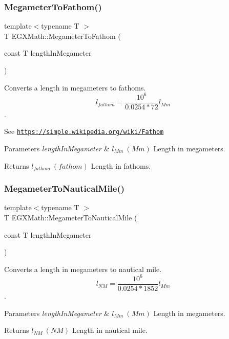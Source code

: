 \subsubsection{\texorpdfstring{Megameter\+To\+Fathom()}{MegameterToFathom()}}
{\footnotesize\ttfamily template$<$typename T $>$ \\
T E\+G\+X\+Math\+::\+Megameter\+To\+Fathom (\begin{DoxyParamCaption}\item[{const T}]{length\+In\+Megameter }\end{DoxyParamCaption})}



Converts a length in megameters to fathoms. \[ l_{fathom}= \frac{10^{6}}{0.0254 * 72} l_{Mm} \]. 

See \href{https://simple.wikipedia.org/wiki/Fathom}{\tt https\+://simple.\+wikipedia.\+org/wiki/\+Fathom} 
\begin{DoxyParams}{Parameters}
{\em length\+In\+Megameter} & $ l_{Mm}\ (Mm)$ Length in megameters. \\
\hline
\end{DoxyParams}
\begin{DoxyReturn}{Returns}
$ l_{fathom}\ (fathom)$ Length in fathoms. 
\end{DoxyReturn}
\mbox{\label{group___e_g_x_math-_conversions-_length_conversions-_s_i-_megameter-_nautical_ga483b575b1654e1d0f6ea1fac63b5f54e}} 
\subsubsection{\texorpdfstring{Megameter\+To\+Nautical\+Mile()}{MegameterToNauticalMile()}}
{\footnotesize\ttfamily template$<$typename T $>$ \\
T E\+G\+X\+Math\+::\+Megameter\+To\+Nautical\+Mile (\begin{DoxyParamCaption}\item[{const T}]{length\+In\+Megameter }\end{DoxyParamCaption})}



Converts a length in megameters to nautical mile. \[ l_{NM}= \frac{10^{6}}{0.0254 * 1852} l_{Mm} \]. 


\begin{DoxyParams}{Parameters}
{\em length\+In\+Megameter} & $ l_{Mm}\ (Mm)$ Length in megameters. \\
\hline
\end{DoxyParams}
\begin{DoxyReturn}{Returns}
$ l_{NM}\ (NM)$ Length in nautical mile. 
\end{DoxyReturn}
